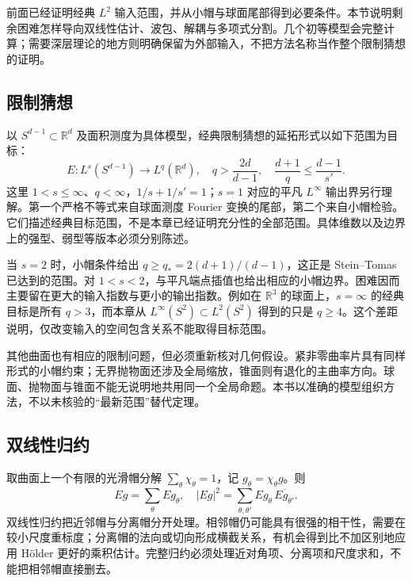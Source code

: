 
前面已经证明经典 \(L^2\) 输入范围，并从小帽与球面尾部得到必要条件。本节说明剩余困难怎样导向双线性估计、波包、解耦与多项式分割。几个初等模型会完整计算；需要深层理论的地方则明确保留为外部输入，不把方法名称当作整个限制猜想的证明。

\subsection{限制猜想}
\label{b2:subsec:230601}

以 \(S^{d-1}\subset\mathbb R^d\) 及面积测度为具体模型，经典限制猜想的延拓形式以如下范围为目标：
\[
 E:L^s(S^{d-1})\longrightarrow L^q(\mathbb R^d),\quad
 q>\frac{2d}{d-1},\quad
 \frac{d+1}{q}\leq\frac{d-1}{s'}.
\]
这里 \(1<s\leq\infty\)、\(q<\infty\)，\(1/s+1/s'=1\)；\(s=1\) 对应的平凡 \(L^\infty\) 输出界另行理解。第一个严格不等式来自球面测度 Fourier 变换的尾部，第二个来自小帽检验。它们描述经典目标范围，不是本章已经证明充分性的全部范围。具体维数以及边界上的强型、弱型等版本必须分别陈述。

\ProseParagraphBreak
当 \(s=2\) 时，小帽条件给出 \(q\geq q_*=2(d+1)/(d-1)\)，这正是 Stein--Tomas 已达到的范围。对 \(1<s<2\)，与平凡端点插值也给出相应的小帽边界。困难因而主要留在更大的输入指数与更小的输出指数。例如在 \(\mathbb R^3\) 的球面上，\(s=\infty\) 的经典目标是所有 \(q>3\)，而本章从 \(L^\infty(S^2)\subset L^2(S^2)\) 得到的只是 \(q\geq4\)。这个差距说明，仅改变输入的空间包含关系不能取得目标范围。

其他曲面也有相应的限制问题，但必须重新核对几何假设。紧非零曲率片具有同样形式的小帽约束；无界抛物面还涉及全局缩放，锥面则有退化的主曲率方向。球面、抛物面与锥面不能无说明地共用同一个全局命题。本书以准确的模型组织方法，不以未核验的“最新范围”替代定理。

\subsection{双线性归约}
\label{b2:subsec:230602}

取曲面上一个有限的光滑帽分解 \(\sum_\theta\chi_\theta=1\)，记 \(g_\theta=\chi_\theta g\)。则
\[
 Eg=\sum_\theta Eg_\theta,\quad
 |Eg|^2=\sum_{\theta,\theta'}
        Eg_\theta\,\overline{Eg_{\theta'}}.
\]
双线性归约把近邻帽与分离帽分开处理。相邻帽仍可能具有很强的相干性，需要在较小尺度重标度；分离帽的法向或切向形成横截关系，有机会得到比不加区别地应用 Hölder 更好的乘积估计。完整归约必须处理近对角项、分离项和尺度求和，不能把相邻帽直接删去。

